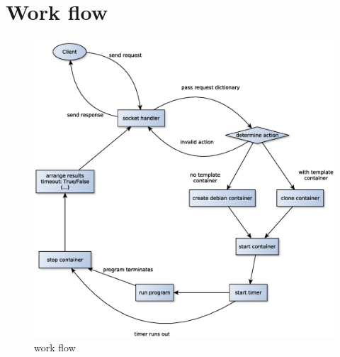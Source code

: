 \section{Work flow}

\begin{figure}[htb]
\begin{center}
  \includegraphics[width=375pt]{fig/figure_2.eps}
  \caption{work flow}
  \label{figure_2}
\end{center}
\end{figure}

